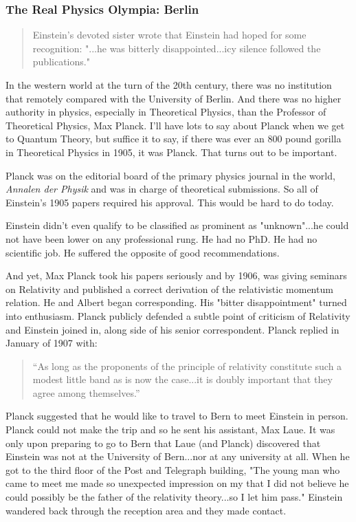 \documentclass[
]{article}
\begin{document}
\hypertarget{the-real-physics-olympia-berlin}{%
\subsubsection{The Real Physics Olympia:
Berlin}\label{the-real-physics-olympia-berlin}}

\begin{quote}
Einstein's devoted sister wrote that Einstein had hoped for some
recognition: "...he was bitterly disappointed...icy silence followed the
publications."
\end{quote}

In the western world at the turn of the 20th century, there was no
institution that remotely compared with the University of Berlin. And
there was no higher authority in physics, especially in Theoretical
Physics, than the Professor of Theoretical Physics, Max Planck. I'll
have lots to say about Planck when we get to Quantum Theory, but suffice
it to say, if there was ever an 800 pound gorilla in Theoretical Physics
in 1905, it was Planck. That turns out to be important.

Planck was on the editorial board of the primary physics journal in the
world, \emph{Annalen der Physik} and was in charge of theoretical
submissions. So all of Einstein's 1905 papers required his approval.
This would be hard to do today.

Einstein didn't even qualify to be classified as prominent as
"unknown"...he could not have been lower on any professional rung. He
had no PhD. He had no scientific job. He suffered the opposite of good
recommendations.

And yet, Max Planck took his papers seriously and by 1906, was giving
seminars on Relativity and published a correct derivation of the
relativistic momentum relation. He and Albert began corresponding. His
"bitter disappointment" turned into enthusiasm. Planck publicly defended
a subtle point of criticism of Relativity and Einstein joined in, along
side of his senior correspondent. Planck replied in January of 1907
with:

\begin{quote}
``As long as the proponents of the principle of relativity constitute
such a modest little band as is now the case...it is doubly important
that they agree among themselves.''
\end{quote}

Planck suggested that he would like to travel to Bern to meet Einstein
in person. Planck could not make the trip and so he sent his assistant,
Max Laue. It was only upon preparing to go to Bern that Laue (and
Planck) discovered that Einstein was not at the University of Bern...nor
at any university at all. When he got to the third floor of the Post and
Telegraph building, "The young man who came to meet me made so
unexpected impression on my that I did not believe he could possibly be
the father of the relativity theory...so I let him pass." Einstein
wandered back through the reception area and they made contact.
\end{document}
